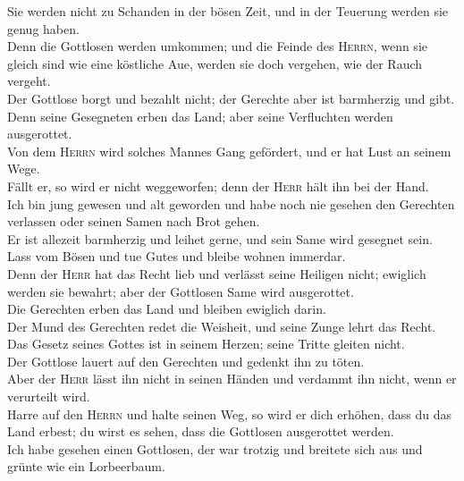 Sie werden nicht zu Schanden in der bösen Zeit, und in
der Teuerung werden sie genug haben.\\
 Denn die Gottlosen werden umkommen; und die Feinde des
\textsc{Herrn}, wenn sie gleich sind wie eine köstliche Aue, werden sie
doch vergehen, wie der Rauch vergeht.\\
 Der Gottlose borgt und bezahlt nicht; der Gerechte aber
ist barmherzig und gibt.\\
 Denn seine Gesegneten erben das Land; aber seine
Verfluchten werden ausgerottet.\\
 Von dem \textsc{Herrn} wird solches Mannes Gang
gefördert, und er hat Lust an seinem Wege.\\
 Fällt er, so wird er nicht weggeworfen; denn der
\textsc{Herr} hält ihn bei der Hand.\\
 Ich bin jung gewesen und alt geworden und habe noch nie
gesehen den Gerechten verlassen oder seinen Samen nach Brot gehen.\\
 Er ist allezeit barmherzig und leihet gerne, und sein
Same wird gesegnet sein.\\
 Lass vom Bösen und tue Gutes und bleibe wohnen
immerdar.\\
 Denn der \textsc{Herr} hat das Recht lieb und verlässt
seine Heiligen nicht; ewiglich werden sie bewahrt; aber der Gottlosen
Same wird ausgerottet.\\
 Die Gerechten erben das Land und bleiben ewiglich
darin.\\
 Der Mund des Gerechten redet die Weisheit, und seine
Zunge lehrt das Recht.\\
 Das Gesetz seines Gottes ist in seinem Herzen; seine
Tritte gleiten nicht.\\
 Der Gottlose lauert auf den Gerechten und gedenkt ihn zu
töten.\\
 Aber der \textsc{Herr} lässt ihn nicht in seinen Händen
und verdammt ihn nicht, wenn er verurteilt wird.\\
 Harre auf den \textsc{Herrn} und halte seinen Weg, so
wird er dich erhöhen, dass du das Land erbest; du wirst es sehen, dass
die Gottlosen ausgerottet werden.\\
 Ich habe gesehen einen Gottlosen, der war trotzig und
breitete sich aus und grünte wie ein Lorbeerbaum.\\
